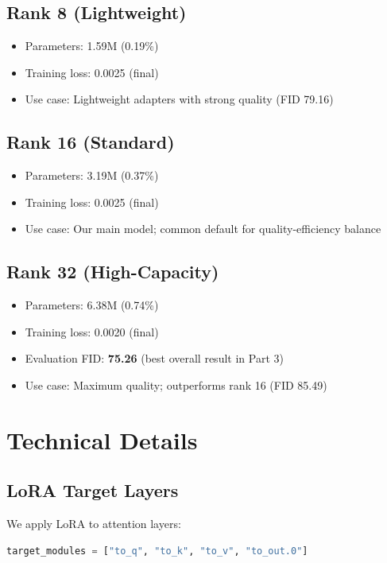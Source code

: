 \documentclass[11pt]{article}
\begin{document}
\subsection{Rank 8 (Lightweight)}

\begin{itemize}
    \item Parameters: 1.59M (0.19\%)
    \item Training loss: 0.0025 (final)
    \item Use case: Lightweight adapters with strong quality (FID 79.16)
\end{itemize}

\subsection{Rank 16 (Standard)}

\begin{itemize}
    \item Parameters: 3.19M (0.37\%)
    \item Training loss: 0.0025 (final)
    \item Use case: Our main model; common default for quality-efficiency balance
\end{itemize}

\subsection{Rank 32 (High-Capacity)}

\begin{itemize}
    \item Parameters: 6.38M (0.74\%)
    \item Training loss: 0.0020 (final)
    \item Evaluation FID: \textbf{75.26} (best overall result in Part 3)
    \item Use case: Maximum quality; outperforms rank 16 (FID 85.49)
\end{itemize}

\section{Technical Details}

\subsection{LoRA Target Layers}

We apply LoRA to attention layers:
\begin{lstlisting}[language=Python]
target_modules = ["to_q", "to_k", "to_v", "to_out.0"]
\end{lstlisting}
\end{document}
